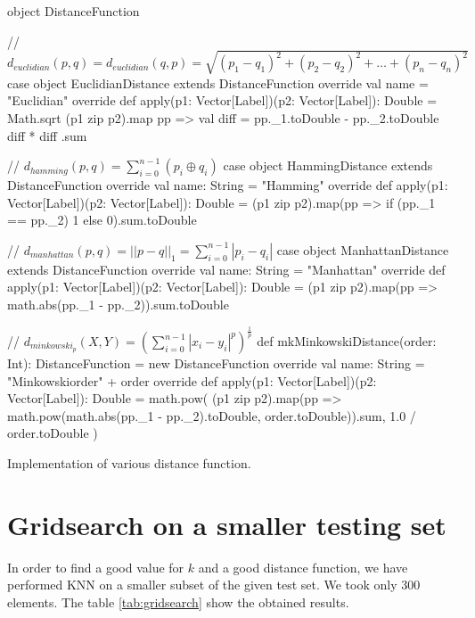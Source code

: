 \documentclass[a4paper,11pt]{report}
\begin{document}
\begin{listing}[ht]
  \centering
  \begin{scalacode}
object DistanceFunction {

  // $d_{euclidian}(p,q) = d_{euclidian}(q,p) = \sqrt{(p_1 - q_1)^2 + (p_2 - q_2)^2 + \dots + (p_n - q_n)^2}$
  case object EuclidianDistance extends DistanceFunction {
    override val name = "Euclidian"
    override def apply(p1: Vector[Label])(p2: Vector[Label]): Double = Math.sqrt {
      (p1 zip p2).map { pp =>
        val diff = pp._1.toDouble - pp._2.toDouble
        diff * diff
      }.sum
    }
  }

  // $d_{hamming}(p,q) = \sum_{i=0}^{n-1}(p_i \oplus q_i)$
  case object HammingDistance extends DistanceFunction {
    override val name: String = "Hamming"
    override def apply(p1: Vector[Label])(p2: Vector[Label]): Double = {
      (p1 zip p2).map(pp => if (pp._1 == pp._2) 1 else 0).sum.toDouble
    }
  }

  // $d_{manhattan}(p,q) = ||p-q||_1 = \sum_{i=0}^{n-1}|p_i - q_i|$
  case object ManhattanDistance extends DistanceFunction {
    override val name: String = "Manhattan"
    override def apply(p1: Vector[Label])(p2: Vector[Label]): Double = {
      (p1 zip p2).map(pp => math.abs(pp._1 - pp._2)).sum.toDouble
    }
  }

  // $d_{minkowski_p}(X,Y) = (\sum_{i=0}^{n-1} |x_i - y_i|^p)^{\frac{1}{p}}$
  def mkMinkowskiDistance(order: Int): DistanceFunction = {
    new DistanceFunction {
      override val name: String = "Minkowskiorder" + order
      override def apply(p1: Vector[Label])(p2: Vector[Label]): Double =
      math.pow(
        (p1 zip p2).map(pp => math.pow(math.abs(pp._1 - pp._2).toDouble, order.toDouble)).sum,
        1.0 / order.toDouble
      )
    }
  }
}
  \end{scalacode}
  \caption{Implementation of various distance function.}
  \label{lst:distances}
\end{listing}

\section*{Gridsearch on a smaller testing set}

In order to find a good value for $k$ and a good distance function, we have
performed KNN on a smaller subset of the given test set. We took only $300$
elements. The table \ref{tab:gridsearch} show the obtained results.
\end{document}
